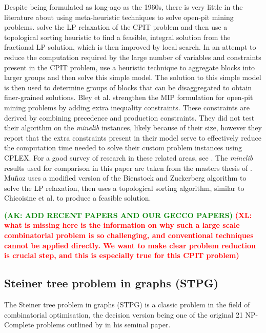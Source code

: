 \documentclass[preprint]{elsarticle}
\newcommand{\xl}[1]{\textbf{\textcolor{red}{(XL: #1)}}}
\newcommand{\ak}[1]{\textbf{\textcolor{green}{(AK: #1)}}}
\begin{document}

Despite being formulated as long-ago as the 1960s, there is very little in the literature about using meta-heuristic techniques to solve open-pit mining problems. \citet{cpit} solve the LP relaxation of the CPIT problem and then use a topological sorting heuristic to find a feasible, integral solution from the fractional LP solution, which is then improved by local search.
%
In an attempt to reduce the computation required by the large number of variables and constraints present in the CPIT problem, \citet{aggregate} use a heuristic technique to aggregate blocks into larger groups and then solve this simple model. The solution to this simple model is then used to determine groups of blocks that can be disaggregated to obtain finer-grained solutions.
%
Bley et al. strengthen the MIP formulation for open-pit mining problems by adding extra inequality constraints. These constraints are derived by combining precedence and production constraints. They did not test their algorithm on the \emph{minelib} instances, likely because of their size, however they report that the extra constraints present in their model serve to effectively reduce the computation time needed to solve their custom problem instances using CPLEX. For a good survey of research in these related areas, see \citet{hochbaum,meagher}.
%
The \emph{minelib} results used for comparison in this paper are taken from the masters thesis of \citet{toposort}. Mu\~noz uses a modified version of the Bienstock and Zuckerberg algorithm \citep{bz} to solve the LP relaxation, then uses a topological sorting algorithm, similar to Chicoisine et al. to produce a feasible solution.

\ak{ADD RECENT PAPERS AND OUR GECCO PAPERS}
\xl{what is missing here is the information on why such a large scale combinatorial problem is so challenging, and conventional techniques cannot be applied directly. We want to make clear problem reduction is crucial step, and this is especially true for this CPIT problem}


\subsection{Steiner tree problem in graphs (STPG)}

The Steiner tree problem in graphs (STPG) is a classic problem in the field of combinatorial optimisation, the decision version being one of the original 21 NP-Complete problems outlined by \citet{np:karp} in his seminal paper.
\end{document}
